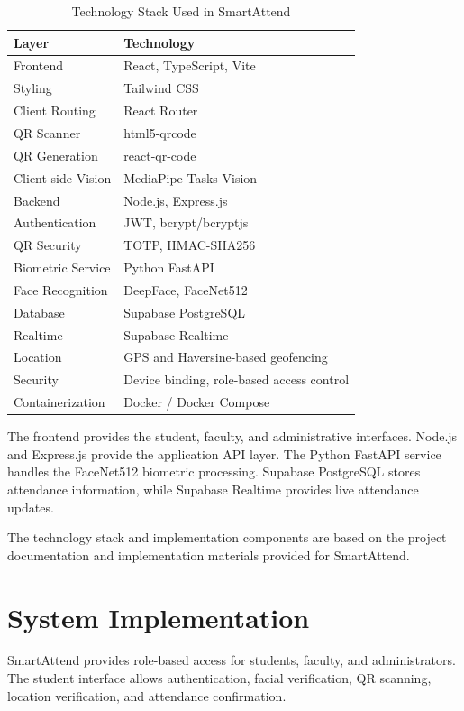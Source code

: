 \documentclass[conference]{IEEEtran}
\begin{document}
\begin{table}[htbp]
\caption{Technology Stack Used in SmartAttend}
\centering
\begin{tabular}{p{} p{}}
\toprule
\textbf{Layer} & \textbf{Technology} \\
\midrule
Frontend & React, TypeScript, Vite \\
Styling & Tailwind CSS \\
Client Routing & React Router \\
QR Scanner & html5-qrcode \\
QR Generation & react-qr-code \\
Client-side Vision & MediaPipe Tasks Vision \\
Backend & Node.js, Express.js \\
Authentication & JWT, bcrypt/bcryptjs \\
QR Security & TOTP, HMAC-SHA256 \\
Biometric Service & Python FastAPI \\
Face Recognition & DeepFace, FaceNet512 \\
Database & Supabase PostgreSQL \\
Realtime & Supabase Realtime \\
Location & GPS and Haversine-based geofencing \\
Security & Device binding, role-based access control \\
Containerization & Docker / Docker Compose \\
\bottomrule
\end{tabular}
\end{table}

The frontend provides the student, faculty, and administrative interfaces. Node.js and Express.js provide the application API layer. The Python FastAPI service handles the FaceNet512 biometric processing. Supabase PostgreSQL stores attendance information, while Supabase Realtime provides live attendance updates.

The technology stack and implementation components are based on the project documentation and implementation materials provided for SmartAttend. 


\section{System Implementation}

SmartAttend provides role-based access for students, faculty, and administrators. The student interface allows authentication, facial verification, QR scanning, location verification, and attendance confirmation.
\end{document}
